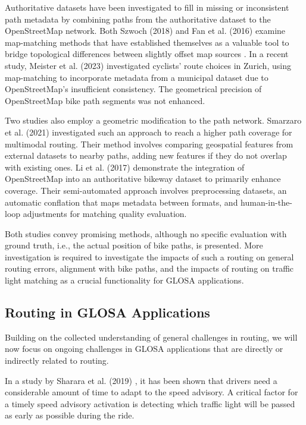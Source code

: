 Authoritative datasets have been investigated to fill in missing or inconsistent path metadata by combining paths from the authoritative dataset to the OpenStreetMap network. Both Szwoch (2018) \cite{szwoch_combining_2019} and Fan et al. (2016) \cite{fan_polygon-based_2016} examine map-matching methods that have established themselves as a valuable tool to bridge topological differences between slightly offset map sources \cite{chao_survey_2020}. In a recent study, Meister et al. (2023) \cite{meister_route_2023} investigated cyclists' route choices in Zurich, using map-matching to incorporate metadata from a municipal dataset due to OpenStreetMap's insufficient consistency. The geometrical precision of OpenStreetMap bike path segments was not enhanced.

Two studies also employ a geometric modification to the path network. Smarzaro et al. (2021) \cite{smarzaro_creation_2021} investigated such an approach to reach a higher path coverage for multimodal routing. Their method involves comparing geospatial features from external datasets to nearby paths, adding new features if they do not overlap with existing ones. Li et al. (2017) \cite{li_optimized_2017} demonstrate the integration of OpenStreetMap into an authoritative bikeway dataset to primarily enhance coverage. Their semi-automated approach involves preprocessing datasets, an automatic conflation that maps metadata between formats, and human-in-the-loop adjustments for matching quality evaluation. 

Both studies convey promising methods, although no specific evaluation with ground truth, i.e., the actual position of bike paths, is presented. More investigation is required to investigate the impacts of such a routing on general routing errors, alignment with bike paths, and the impacts of routing on traffic light matching as a crucial functionality for GLOSA applications.

\subsection{Routing in GLOSA Applications}

Building on the collected understanding of general challenges in routing, we will now focus on ongoing challenges in GLOSA applications that are directly or indirectly related to routing.

In a study by Sharara et al. (2019) \cite{sharara_impact_2019}, it has been shown that drivers need a considerable amount of time to adapt to the speed advisory. A critical factor for a timely speed advisory activation is detecting which traffic light will be passed as early as possible during the ride. 

